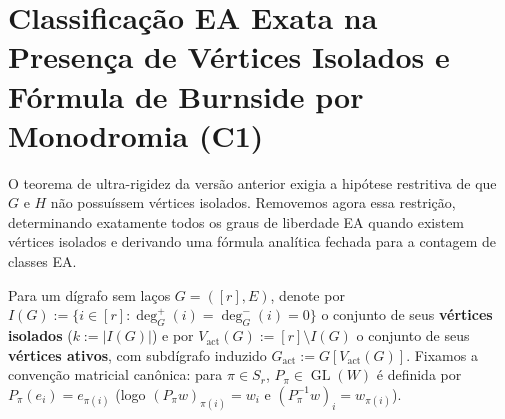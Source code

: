 \documentclass[11pt,a4paper]{article}
\theoremstyle{definition}
\theoremstyle{remark}
\newcommand{\GL}{\operatorname{GL}}
\begin{document}
\vspace{8pt}
\section{Classificação EA Exata na Presença de Vértices Isolados e Fórmula de Burnside por Monodromia (C1)}

O teorema de ultra-rigidez da versão anterior exigia a hipótese restritiva de que $G$ e $H$ não possuíssem vértices isolados. Removemos agora essa restrição, determinando exatamente todos os graus de liberdade EA quando existem vértices isolados e derivando uma fórmula analítica fechada para a contagem de classes EA.

Para um dígrafo sem laços $G = ([r], E)$, denote por $I(G) := \{i \in [r] : \deg_G^+(i) = \deg_G^-(i) = 0\}$ o conjunto de seus \textbf{vértices isolados} ($k := |I(G)|$) e por $V_{\mathrm{act}}(G) := [r] \setminus I(G)$ o conjunto de seus \textbf{vértices ativos}, com subdígrafo induzido $G_{\mathrm{act}} := G[V_{\mathrm{act}}(G)]$. Fixamos a convenção matricial canônica: para $\pi \in S_r$, $P_\pi \in \GL(W)$ é definida por $P_\pi(e_i) = e_{\pi(i)}$ (logo $(P_\pi w)_{\pi(i)} = w_i$ e $(P_\pi^{-1} w)_i = w_{\pi(i)}$).
\end{document}

